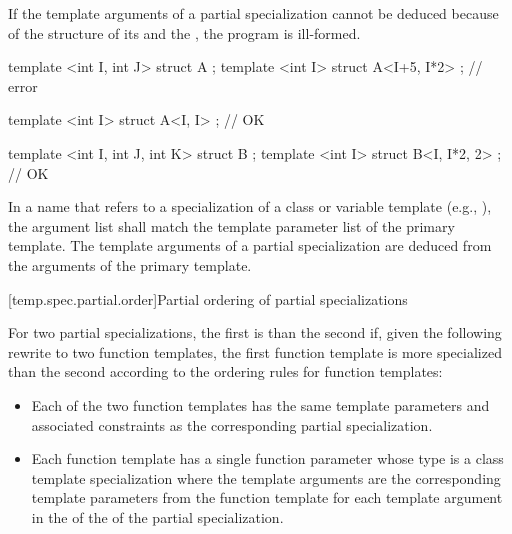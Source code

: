 \pnum
If the template arguments of a partial specialization cannot be deduced
because of the structure of its 
and the ,
the program is ill-formed.
\begin{example}
\begin{codeblock}
template <int I, int J> struct A {};
template <int I> struct A<I+5, I*2> {};     // error

template <int I> struct A<I, I> {};         // OK

template <int I, int J, int K> struct B {};
template <int I> struct B<I, I*2, 2> {};    // OK
\end{codeblock}
\end{example}

\pnum
In a name that refers to a specialization of a class or variable template
(e.g., ),
the argument list shall match the template parameter list of the primary
template.
The template arguments of a partial specialization are deduced from the arguments
of the primary template.

[temp.spec.partial.order]{Partial ordering of partial specializations}

\pnum
{}%
For two partial specializations,
the first is  than the second if, given the following
rewrite to two function templates, the first function template is more
specialized than the second according to the ordering rules for function
templates:

\begin{itemize}
\item
Each of the two
function templates has the same template parameters
and associated constraints
as the corresponding partial specialization.
\item
Each function template
has a single function parameter
whose type is a class template specialization where the template arguments
are the corresponding template parameters from the function template
for each template argument
in the 
of the 
of the partial specialization.
\end{itemize}

